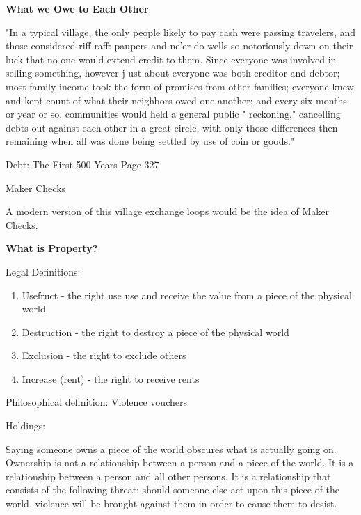 \documentclass{article}
\begin{document}
\pagebreak
{\huge \textbf{What we Owe to Each Other}}


"In a typical village, the only people likely to pay cash were passing
travelers, and those considered riff-raff: paupers and ne'er-do-wells so
notoriously down on their luck that no one would extend credit to
them. Since everyone was involved in selling something, however j ust
about everyone was both creditor and debtor; most family income took
the form of promises from other families; everyone knew and kept
count of what their neighbors owed one another; and every six months
or year or so, communities would held a general public " reckoning,"
cancelling debts out against each other in a great circle, with only those
differences then remaining when all was done being settled by use of
coin or goods."

Debt: The First 500 Years Page 327

\large Maker Checks

A modern version of this village exchange loops would be the idea of Maker Checks. 




\pagebreak
{\huge \textbf{What is Property?}}

\large Legal Definitions:

\begin{enumerate}
	
	\item Usefruct - the right use use and receive the value from a piece of the physical world

	\item Destruction - the right to destroy a piece of the physical world

	\item Exclusion -  the right to exclude others
 
	\item Increase (rent) - the right to receive rents
\end{enumerate}
	
\large Philosophical definition: Violence vouchers

\large Holdings:

Saying someone owns a piece of the world obscures what is actually going on. Ownership is not a relationship between a person and a piece of the world. It is a relationship between a person and all other persons. It is a relationship that consists of the following threat: should someone else act upon this piece of the world, violence will be brought against them in order to cause them to desist.
\end{document}
